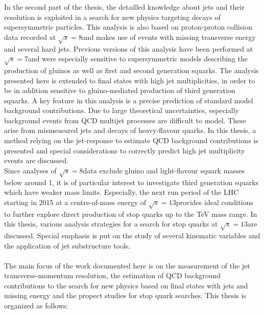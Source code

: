 In the second part of the thesis, the detailled knowledge about jets and their resolution is exploited in a search for new physics targeting decays of supersymmetric particles. This analysis is also based on proton-proton collision data recorded at $\sqrt{s} = 8$\tev and makes use of events with missing transverse energy and several hard jets. Previous versions of this analysis have been performed at $\sqrt{s} = 7$\tev and were especially sensitive to supersymmetric models describing the production of gluinos as well as first and second generation squarks. The analysis presented here is extended to final states with high jet multiplicities, in order to be in addition sensitive to gluino-mediated production of third generation squarks. A key feature in this analysis is a precise prediction of standard model background contributions. Due to large theoretical uncertainties, especially background events from QCD multijet processes are difficult to model. These arise from mismeasured jets and decays of heavy-flavour quarks. In this thesis, a method relying on the jet-\pt response to estimate QCD background contributions is presented and special considerations to correctly predict high jet multiplicity events are discussed.  \\
Since analyses of $\sqrt{s} = 8$\tev data exclude gluino and light-flavour squark masses below around 1\tev, it is of particular interest to investigate third generation squarks which have weaker mass limits. Especially, the next run period of the LHC starting in 2015 at a centre-of-mass energy of $\sqrt{s} = 13$\tev provides ideal conditions to further explore direct production of stop quarks up to the TeV mass range. In this thesis, various analysis strategies for a search for stop quarks at $\sqrt{s} = 13$\tev are discussed. Special emphasis is put on the study of several kinematic variables and the application of jet substructure tools. \\ 
\\
The main focus of the work documented here is on the measurement of the jet transverse-momentum resolution, the estimation of QCD background contributions to the search for new physics based on final states with jets and missing energy and the propect studies for stop quark searches. This thesis is organized as follows:
